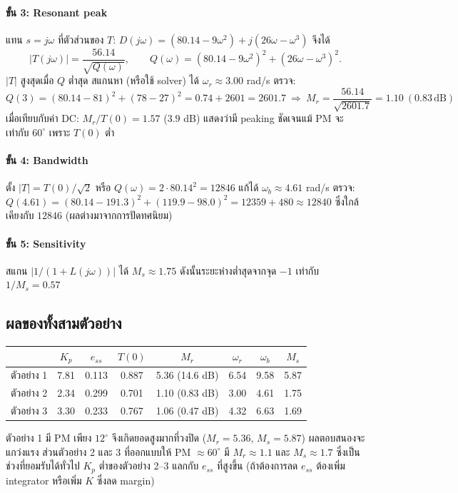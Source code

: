 \documentclass[12pt,a4paper]{article}
\newcommand{\dB}{\,\mathrm{dB}}
\newcommand{\jw}{j\omega}
\begin{document}
\paragraph{ขั้น 3: Resonant peak}
แทน $s=\jw$ ที่ตัวส่วนของ $T$: $D(\jw)=(80.14-9\omega^2)+j(26\omega-\omega^3)$ จึงได้
\[
|T(\jw)|=\frac{56.14}{\sqrt{Q(\omega)}},\qquad Q(\omega)=(80.14-9\omega^2)^2+(26\omega-\omega^3)^2 .
\]
$|T|$ สูงสุดเมื่อ $Q$ ต่ำสุด สแกนหา (หรือใช้ solver) ได้ $\omega_r\approx3.00$ rad/s ตรวจ:
\[
Q(3)=(80.14-81)^2+(78-27)^2=0.74+2601=2601.7
\ \Rightarrow\ M_r=\frac{56.14}{\sqrt{2601.7}}=1.10\ (0.83\dB)
\]
เมื่อเทียบกับค่า DC: $M_r/T(0)=1.57$ ($3.9$ dB) แสดงว่ามี peaking ชัดเจนแม้ PM จะเท่ากับ $60^\circ$ เพราะ $T(0)$ ต่ำ

\paragraph{ขั้น 4: Bandwidth}
ตั้ง $|T|=T(0)/\sqrt2$ หรือ $Q(\omega)=2\cdot80.14^2=12846$ แก้ได้ $\omega_b\approx4.61$ rad/s ตรวจ: $Q(4.61)=(80.14-191.3)^2+(119.9-98.0)^2=12359+480\approx12840$ ซึ่งใกล้เคียงกับ $12846$ (ผลต่างมาจากการปัดทศนิยม)

\paragraph{ขั้น 5: Sensitivity}
สแกน $|1/(1+L(\jw))|$ ได้ $M_s\approx1.75$ ดังนั้นระยะห่างต่ำสุดจากจุด $-1$ เท่ากับ $1/M_s=0.57$

\subsection{ผลของทั้งสามตัวอย่าง}
\begin{center}
\small
\renewcommand{\arraystretch}{1.25}
\begin{tabular}{@{}lccccccc@{}}
\toprule
 & $K_p$ & $e_{ss}$ & $T(0)$ & $M_r$ & $\omega_r$ & $\omega_b$ & $M_s$ \\
\midrule
ตัวอย่าง 1 & 7.81 & 0.113 & 0.887 & 5.36 (14.6 dB) & 6.54 & 9.58 & 5.87 \\
ตัวอย่าง 2 & 2.34 & 0.299 & 0.701 & 1.10 (0.83 dB) & 3.00 & 4.61 & 1.75 \\
ตัวอย่าง 3 & 3.30 & 0.233 & 0.767 & 1.06 (0.47 dB) & 4.32 & 6.63 & 1.69 \\
\bottomrule
\end{tabular}
\end{center}
ตัวอย่าง 1 มี PM เพียง $12^\circ$ จึงเกิดยอดสูงมากที่วงปิด ($M_r=5.36$, $M_s=5.87$) ผลตอบสนองจะแกว่งแรง ส่วนตัวอย่าง 2 และ 3 ที่ออกแบบให้ PM $\approx60^\circ$ มี $M_r\approx1.1$ และ $M_s\approx1.7$ ซึ่งเป็นช่วงที่ยอมรับได้ทั่วไป $K_p$ ต่ำของตัวอย่าง 2--3 แลกกับ $e_{ss}$ ที่สูงขึ้น (ถ้าต้องการลด $e_{ss}$ ต้องเพิ่ม integrator หรือเพิ่ม $K$ ซึ่งลด margin)
\end{document}
